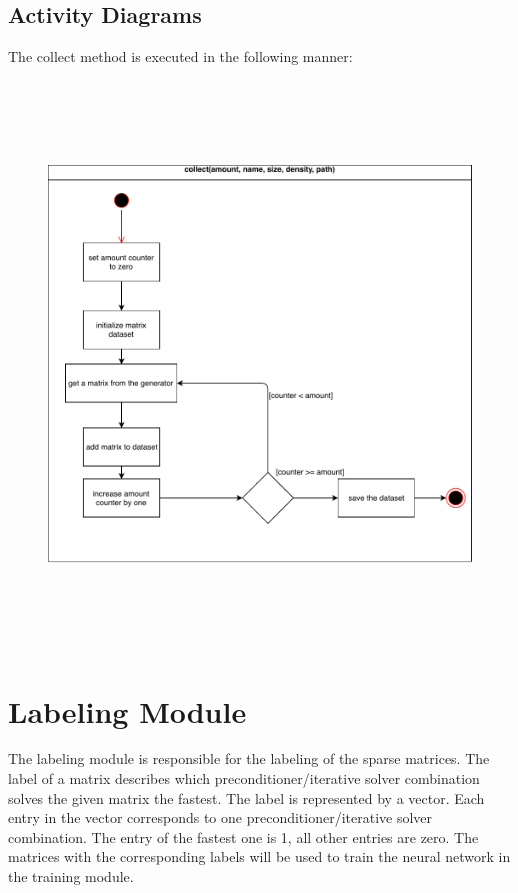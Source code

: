 \documentclass[parskip=full]{scrartcl}
\begin{document}
\subsection{Activity Diagrams}
The collect method is executed in the following manner:
\begin{figure}[h]
\begin{center}
\includegraphics[width=17cm,height=15cm,keepaspectratio]{ActivityDiagrams/PDF/Collector_collect_activity.pdf}
%
\label{Activity Diagrams}
\end{center}
\end{figure}

\section{Labeling Module}
The labeling module is responsible for the labeling of the sparse matrices. The \gls{label} of a matrix describes which \gls{preconditioner}/\gls{iterative solver} combination solves the given matrix the fastest. The \gls{label} is represented by a vector. Each entry in the vector corresponds to one \gls{preconditioner}/\gls{iterative solver} combination. The entry of the fastest one is 1, all other entries are zero. The matrices with the corresponding \glspl{label} will be used to train the neural network in the training module.
\end{document}
